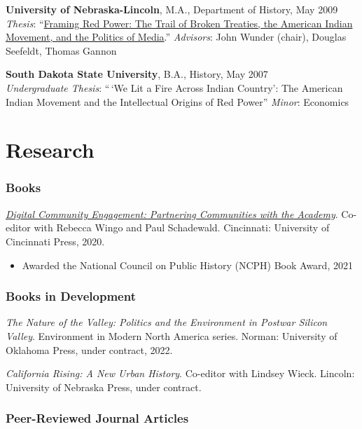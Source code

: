 \textbf{University of Nebraska-Lincoln}, M.A., Department of History,
May 2009\\
\emph{Thesis}:
``\href{http://digitalcommons.unl.edu/historydiss/21/}{Framing Red
Power: The Trail of Broken Treaties, the American Indian Movement, and
the Politics of Media}.'' \emph{Advisors}: John Wunder (chair), Douglas
Seefeldt, Thomas Gannon

\textbf{South Dakota State University}, B.A., History, May 2007\\
\emph{Undergraduate Thesis}: ``\,`We Lit a Fire Across Indian Country':
The American Indian Movement and the Intellectual Origins of Red Power''
\emph{Minor}: Economics

\section{Research}\label{research}

\subsubsection{Books}\label{books}

\emph{\href{https://ucincinnatipress.manifoldapp.org/projects/digital-community-engagement}{Digital
Community Engagement: Partnering Communities with the Academy}}.
Co-editor with Rebecca Wingo and Paul Schadewald. Cincinnati: University
of Cincinnati Press, 2020.

\begin{itemize}
\tightlist
\item
  Awarded the National Council on Public History (NCPH) Book Award, 2021
\end{itemize}

\subsubsection{Books in Development}\label{books-in-development}

\emph{The Nature of the Valley: Politics and the Environment in Postwar
Silicon Valley}. Environment in Modern North America series. Norman:
University of Oklahoma Press, under contract, 2022.

\emph{California Rising: A New Urban History}. Co-editor with Lindsey
Wieck. Lincoln: University of Nebraska Press, under contract.

\subsubsection{Peer-Reviewed Journal
Articles}\label{peer-reviewed-journal-articles}

